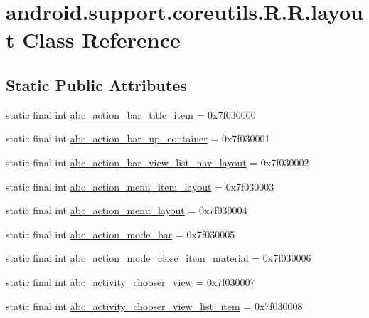 \hypertarget{classandroid_1_1support_1_1coreutils_1_1_r_1_1layout}{
\section{android.support.coreutils.R.R.layout Class Reference}
\label{classandroid_1_1support_1_1coreutils_1_1_r_1_1layout}
}
\subsection*{Static Public Attributes}
\begin{CompactItemize}
\item 
static final int \hyperlink{classandroid_1_1support_1_1coreutils_1_1_r_1_1layout_d5d694855db1d49af755d10143457575}{abc\_\-action\_\-bar\_\-title\_\-item} = 0x7f030000
\item 
static final int \hyperlink{classandroid_1_1support_1_1coreutils_1_1_r_1_1layout_014f51dd7e9c0a2fc241a92a8e4f4648}{abc\_\-action\_\-bar\_\-up\_\-container} = 0x7f030001
\item 
static final int \hyperlink{classandroid_1_1support_1_1coreutils_1_1_r_1_1layout_7ac833ce92e57611f812f84d97a02227}{abc\_\-action\_\-bar\_\-view\_\-list\_\-nav\_\-layout} = 0x7f030002
\item 
static final int \hyperlink{classandroid_1_1support_1_1coreutils_1_1_r_1_1layout_d119e2413580a1027ae7724c7232fb92}{abc\_\-action\_\-menu\_\-item\_\-layout} = 0x7f030003
\item 
static final int \hyperlink{classandroid_1_1support_1_1coreutils_1_1_r_1_1layout_e910aa4b6cd1ca4fb060f3f85c5176a9}{abc\_\-action\_\-menu\_\-layout} = 0x7f030004
\item 
static final int \hyperlink{classandroid_1_1support_1_1coreutils_1_1_r_1_1layout_51e85ba9b190235cdf7322c848319290}{abc\_\-action\_\-mode\_\-bar} = 0x7f030005
\item 
static final int \hyperlink{classandroid_1_1support_1_1coreutils_1_1_r_1_1layout_844f9abb1c11ce007c73a1690b030e31}{abc\_\-action\_\-mode\_\-close\_\-item\_\-material} = 0x7f030006
\item 
static final int \hyperlink{classandroid_1_1support_1_1coreutils_1_1_r_1_1layout_2f43f9550d60cbce95de86f1fbc82658}{abc\_\-activity\_\-chooser\_\-view} = 0x7f030007
\item 
static final int \hyperlink{classandroid_1_1support_1_1coreutils_1_1_r_1_1layout_bcfd1e1b03e74cfdb68498fd80a6a72f}{abc\_\-activity\_\-chooser\_\-view\_\-list\_\-item} = 0x7f030008

\end{CompactItemize}
